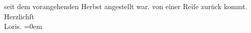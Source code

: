 \begin{ledgroupsized}[t]{13cm}
{{{                   seit dem vorangehenden Herbst angestellt
                        war.}}}\label{K_L00173_1h} von einer Reiſe zurück kommt.\pend
           \pstart
           Herzlichſt{\\[\baselineskip]}\spacefill\mbox{Loris.}\pend
           \leftskip=0em{}\endnumbering{}\end{ledgroupsized}  \newcommand{\dateiname}{L00173}\newcommand{\titel}{Hugo von Hofmannsthal an Arthur Schnitzler, 9. 2. 1893}\newcommand{\editorInnen}{ Martin Anton Müller und Gerd-Hermann Susen}
      
